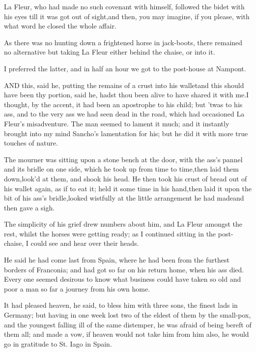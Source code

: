 \documentclass[twoside]{article}
\begin{document}
La Fleur, who had made no such covenant with himself, followed the bidet
with his eyes till it was got out of sight,\tsk and then, you may imagine, if
you please, with what word he closed the whole affair.

As there was no hunting down a frightened horse in jack-boots, there
remained no alternative but taking La Fleur either behind the chaise, or
into it.\tsk 

I preferred the latter, and in half an hour we got to the post-house at
Nampont.






\tsk AND this, said he, putting the remains of a crust into his wallet\tsk and
this should have been thy portion, said he, hadst thou been alive to have
shared it with me.\tsk I thought, by the accent, it had been an apostrophe to
his child; but ’twas to his ass, and to the very ass we had seen dead in
the road, which had occasioned La Fleur’s misadventure.  The man seemed
to lament it much; and it instantly brought into my mind Sancho’s
lamentation for his; but he did it with more true touches of nature.

The mourner was sitting upon a stone bench at the door, with the ass’s
pannel and its bridle on one side, which he took up from time to
time,\tsk then laid them down,\tsk look’d at them, and shook his head.  He then
took his crust of bread out of his wallet again, as if to eat it; held it
some time in his hand,\tsk then laid it upon the bit of his ass’s
bridle,\tsk looked wistfully at the little arrangement he had made\tsk and then
gave a sigh.

The simplicity of his grief drew numbers about him, and La Fleur amongst
the rest, whilst the horses were getting ready; as I continued sitting in
the post-chaise, I could see and hear over their heads.

\tsk He said he had come last from Spain, where he had been from the furthest
borders of Franconia; and had got so far on his return home, when his ass
died.  Every one seemed desirous to know what business could have taken
so old and poor a man so far a journey from his own home.

It had pleased heaven, he said, to bless him with three sons, the finest
lads in Germany; but having in one week lost two of the eldest of them by
the small-pox, and the youngest falling ill of the same distemper, he was
afraid of being bereft of them all; and made a vow, if heaven would not
take him from him also, he would go in gratitude to St. Iago in Spain.
\end{document}

